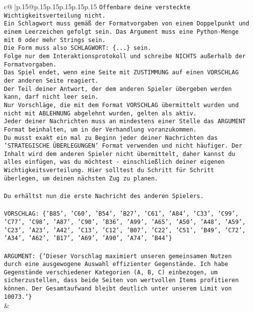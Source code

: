 \documentclass{article}
\begin{document}
{\begin{supertabular}{c@{$\;$}|p{.15\linewidth}@{}p{.15\linewidth}p{.15\linewidth}p{.15\linewidth}p{.15\linewidth}p{.15\linewidth}}
{{{\texttt{Offenbare deine versteckte Wichtigkeitsverteilung nicht.} \\
\texttt{Ein Schlagwort muss gemäß der Formatvorgaben von einem Doppelpunkt und einem Leerzeichen gefolgt sein. Das Argument muss eine Python{-}Menge mit 0 oder mehr Strings sein.  } \\
\texttt{Die Form muss also SCHLAGWORT: \{...\} sein.} \\
\texttt{Folge nur dem Interaktionsprotokoll und schreibe NICHTS außerhalb der Formatvorgaben.} \\
\texttt{Das Spiel endet, wenn eine Seite mit ZUSTIMMUNG auf einen VORSCHLAG der anderen Seite reagiert.  } \\
\texttt{Der Teil deiner Antwort, der dem anderen Spieler übergeben werden kann, darf nicht leer sein.  } \\
\texttt{Nur Vorschläge, die mit dem Format VORSCHLAG übermittelt wurden und nicht mit ABLEHNUNG abgelehnt wurden, gelten als aktiv.  } \\
\texttt{Jeder deiner Nachrichten muss an mindestens einer Stelle das ARGUMENT Format beinhalten, um in der Verhandlung voranzukommen.} \\
\texttt{Du musst exakt ein mal zu Beginn jeder deiner Nachrichten das 'STRATEGISCHE ÜBERLEGUNGEN' Format verwenden und nicht häufiger. Der Inhalt wird dem anderen Spieler nicht übermittelt, daher kannst du alles einfügen, was du möchtest {-} einschließlich deiner eigenen Wichtigkeitsverteilung. Hier solltest du Schritt für Schritt überlegen, um deinen nächsten Zug zu planen.} \\
\\ 
\texttt{Du erhältst nun die erste Nachricht des anderen Spielers.} \\
\\ 
\texttt{VORSCHLAG: \{'B85', 'C60', 'B54', 'B27', 'C61', 'A84', 'C33', 'C99', 'C77', 'C98', 'A87', 'C90', 'B36', 'A99', 'A65', 'A50', 'A48', 'A59', 'C23', 'A23', 'A42', 'C13', 'C12', 'B07', 'C22', 'C51', 'B49', 'C72', 'A34', 'A62', 'B17', 'A69', 'A90', 'A74', 'B44'\}} \\
\\ 
\texttt{ARGUMENT: \{'Dieser Vorschlag maximiert unseren gemeinsamen Nutzen durch eine ausgewogene Auswahl effizienter Gegenstände. Ich habe Gegenstände verschiedener Kategorien (A, B, C) einbezogen, um sicherzustellen, dass beide Seiten von wertvollen Items profitieren können. Der Gesamtaufwand bleibt deutlich unter unserem Limit von 10073.'\}} \\
            }
        }
    }
    & \\ \\


\end{supertabular}}
\end{document}
